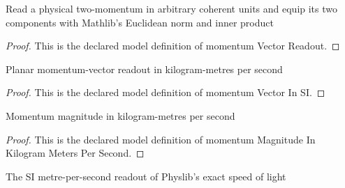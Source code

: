 \begin{definition}
  \label{def:physics:phyx-mini-0540:phyxminiproblems-problemphyxmini0540-momentumvectorreadout}
  Read a physical two-momentum in arbitrary coherent units and equip its two components with Mathlib's Euclidean norm and inner product
\end{definition}
\begin{proof}
  This is the declared model definition of momentum Vector Readout.
\end{proof}
\begin{definition}
  \label{def:physics:phyx-mini-0540:phyxminiproblems-problemphyxmini0540-momentumvectorinsi}
  Planar momentum-vector readout in kilogram-metres per second
\end{definition}
\begin{proof}
  This is the declared model definition of momentum Vector In SI.
\end{proof}
\begin{definition}
  \label{def:physics:phyx-mini-0540:phyxminiproblems-problemphyxmini0540-momentummagnitudeinkilogrammeterspersecond}
  Momentum magnitude in kilogram-metres per second
\end{definition}
\begin{proof}
  This is the declared model definition of momentum Magnitude In Kilogram Meters Per Second.
\end{proof}
\begin{definition}
  \label{def:physics:phyx-mini-0540:phyxminiproblems-problemphyxmini0540-speedoflightinmeterspersecond}
  The SI metre-per-second readout of Physlib's exact speed of light
\end{definition}
